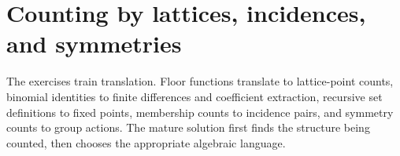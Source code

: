 \section{Counting by lattices, incidences, and symmetries}

The exercises train translation.  Floor functions translate to lattice-point counts, binomial identities to finite differences and coefficient extraction, recursive set definitions to fixed points, membership counts to incidence pairs, and symmetry counts to group actions.  The mature solution first finds the structure being counted, then chooses the appropriate algebraic language.
